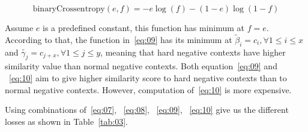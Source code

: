 \documentclass[12pt, sort&compress]{report}
\begin{document}
\begin{equation}
	\label{eq:11}
	\text{binaryCrossentropy}(e, f) = -e\log(f) - (1-e)\log(1-f)
\end{equation}
\par Assume $e$ is a predefined constant, this function has minimum at $f=e$. According to that, the function in~\eqref{eq:09} has its minimum at $\tilde{\beta}_i = c_{i}, \forall 1 \leq i \leq x$ and $\tilde{\gamma_j}=c_{j + x}, \forall 1\leq j\leq y$, meaning that hard negative contexts have higher similarity value than normal negative contexts. Both equation~\eqref{eq:09} and ~\eqref{eq:10} aim to give higher similarity score to hard negative contexts than to normal negative contexts. However, computation of~\eqref{eq:10} is more expensive.
\par Using combinations of~\eqref{eq:07}, ~\eqref{eq:08}, ~\eqref{eq:09}, ~\eqref{eq:10} give us the different losses as shown in Table~\ref{tab:03}.
\end{document}
